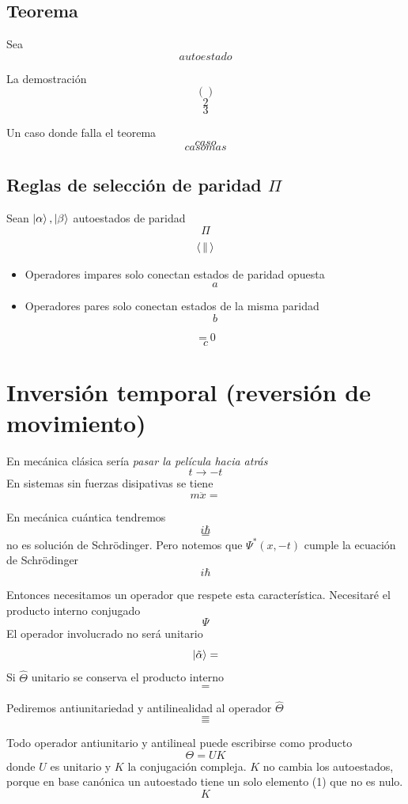 \documentclass[10pt,oneside]{CBFT_book}
\begin{document}
\subsection{Teorema}

Sea 
\[
	autoestado 
\]

La demostración 
\[
	()
\]
\[
	2
\]
\[
	3
\]

Un caso donde falla el teorema 
\[
	caso
\]
\[
	caso mas
\]

\subsection{Reglas de selección de paridad $\Pi$}

Sean $\Ket{\alpha}, \Ket{\beta}$ autoestados de paridad 
\[
	\Pi
\]
\[
	\Braket{||}
\]

\begin{itemize}
 \item Operadores impares solo conectan estados de paridad opuesta
 \[
	a
 \]
 \item Operadores pares solo conectan estados de la misma paridad 
 \[
	b
 \]
\end{itemize}

\[
	= 0
\]
\[
	c
\]

\section{Inversión temporal (reversión de movimiento)}

En mecánica clásica sería {\it pasar la película hacia atrás}
\[
	t \longrightarrow -t
\]
En sistemas sin fuerzas disipativas se tiene 
\[
	m \ddot{x} =
\]

En mecánica cuántica tendremos 
\[
	i \hbar 
\]
\[
	=
\]
no es solución de Schrödinger. 
Pero notemos que $\Psi^*(x,-t)$ cumple la ecuación de Schrödinger
\[
	i\hbar
\]

Entonces necesitamos un operador que respete esta característica. Necesitaré el producto interno conjugado 
\[
	\Psi
\]
El operador involucrado no será unitario 
\[
	\Ket{\tilde{\alpha}} = 
\]
Si $\hat{\Theta}$ unitario se conserva el producto interno 
\[
	=
\]

Pediremos antiunitariedad y antilinealidad al operador $\hat{\Theta}$
\[
	=
\]
\[
	=
\]

Todo operador antiunitario y antilineal puede escribirse como producto 
\[
	\Theta = U K
\]
donde $U$ es unitario y $K$ la conjugación compleja. $K$ no cambia los autoestados, porque en base canónica 
un autoestado tiene un solo elemento (1) que no es nulo.
\[
	K
\]
\end{document}
